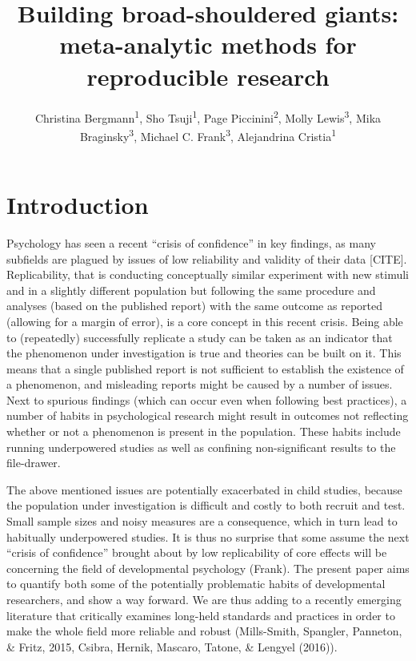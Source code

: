 \documentclass[english,floatsintext,man]{apa6}
\title{Building broad-shouldered giants: meta-analytic methods for reproducible
research}
\author{
          Christina Bergmann\textsuperscript{1},
          Sho Tsuji\textsuperscript{1},
          Page Piccinini\textsuperscript{2},
          Molly Lewis\textsuperscript{3},
          Mika Braginsky\textsuperscript{3},
          Michael C. Frank\textsuperscript{3},
          Alejandrina Cristia\textsuperscript{1}  }
\affiliation{
    \vspace{0.5cm}
          \textsuperscript{1} Laboratoire de Sciences Cognitives et Psycholinguistique, ENS\\
          \textsuperscript{2} NeuroPsychologie Interventionnelle, ENS\\
          \textsuperscript{3} Department Psychology, Stanford University  }
\begin{document}
\maketitle



\section{Introduction}\label{introduction}

Psychology has seen a recent \enquote{crisis of confidence} in key
findings, as many subfields are plagued by issues of low reliability and
validity of their data {[}CITE{]}. Replicability, that is conducting
conceptually similar experiment with new stimuli and in a slightly
different population but following the same procedure and analyses
(based on the published report) with the same outcome as reported
(allowing for a margin of error), is a core concept in this recent
crisis. Being able to (repeatedly) successfully replicate a study can be
taken as an indicator that the phenomenon under investigation is true
and theories can be built on it. This means that a single published
report is not sufficient to establish the existence of a phenomenon, and
misleading reports might be caused by a number of issues. Next to
spurious findings (which can occur even when following best practices),
a number of habits in psychological research might result in outcomes
not reflecting whether or not a phenomenon is present in the population.
These habits include running underpowered studies as well as confining
non-significant results to the file-drawer.

The above mentioned issues are potentially exacerbated in child studies,
because the population under investigation is difficult and costly to
both recruit and test. Small sample sizes and noisy measures are a
consequence, which in turn lead to habitually underpowered studies. It
is thus no surprise that some assume the next \enquote{crisis of
confidence} brought about by low replicability of core effects will be
concerning the field of developmental psychology (Frank). The present
paper aims to quantify both some of the potentially problematic habits
of developmental researchers, and show a way forward. We are thus adding
to a recently emerging literature that critically examines long-held
standards and practices in order to make the whole field more reliable
and robust (Mills-Smith, Spangler, Panneton, \& Fritz, 2015, Csibra,
Hernik, Mascaro, Tatone, \& Lengyel (2016)).
\end{document}
